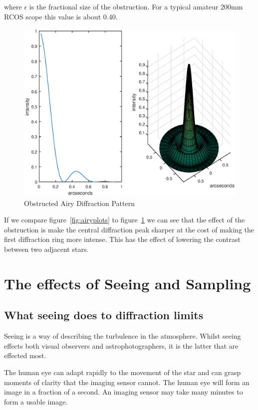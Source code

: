 \documentclass[11pt]{article}
\begin{document}
where $\epsilon$ is the fractional size of the obstruction.  For a typical amateur 200mm RCOS scope this value is about 0.40.  

\begin{figure}[htb]
	\begin{center}
		\includegraphics[scale=0.7]{obstructed-airy.eps}
		\caption{Obstructed Airy Diffraction Pattern}
		\label{fig:obstructed-airy}
	\end{center}
\end{figure}

If we compare figure~\ref{fig:airyplots} to figure~\ref{fig:obstructed-airy} we can see that the effect of the obstruction is make the central diffraction peak sharper at the cost of making the first diffraction ring more intense.  This has the effect of lowering the contrast between two adjacent stars.  

\section{The effects of Seeing and Sampling}

\subsection{What seeing does to diffraction limits}
Seeing is a way of describing the turbulence in the atmosphere.  Whilst seeing effects both visual observers and astrophotographers, it is the latter that are effected most.  

The human eye can adapt rapidly to the movement of the star and can grasp moments of clarity that the imaging sensor cannot.  The human eye will form an image in a fraction of a second. An imaging sensor may take many minutes to form a usable image.
\end{document}
